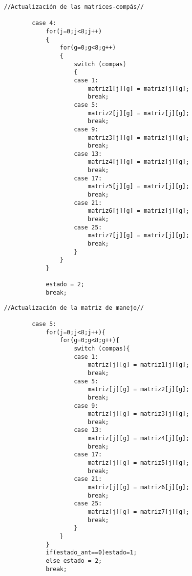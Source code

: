 \documentclass[12pt,a4paper]{article}
\begin{document}
\begin{lstlisting}[basicstyle=\footnotesize] 
            //Actualización de las matrices-compás//

        case 4:
            for(j=0;j<8;j++)
            {
                for(g=0;g<8;g++)
                {
                    switch (compas)
                    {
                    case 1:
                        matriz1[j][g] = matriz[j][g];
                        break;
                    case 5:
                        matriz2[j][g] = matriz[j][g];
                        break;
                    case 9:
                        matriz3[j][g] = matriz[j][g];
                        break;
                    case 13:
                        matriz4[j][g] = matriz[j][g];
                        break;
                    case 17:
                        matriz5[j][g] = matriz[j][g];
                        break;
                    case 21:
                        matriz6[j][g] = matriz[j][g];
                        break;
                    case 25:
                        matriz7[j][g] = matriz[j][g];
                        break;
                    }
                }
            }

            estado = 2;
            break;
\end{lstlisting}

\begin{lstlisting}[basicstyle=\footnotesize] 
            //Actualización de la matriz de manejo//

        case 5:
            for(j=0;j<8;j++){
                for(g=0;g<8;g++){
                    switch (compas){
                    case 1:
                        matriz[j][g] = matriz1[j][g];
                        break;
                    case 5:
                        matriz[j][g] = matriz2[j][g];
                        break;
                    case 9:
                        matriz[j][g] = matriz3[j][g];
                        break;
                    case 13:
                        matriz[j][g] = matriz4[j][g];
                        break;
                    case 17:
                        matriz[j][g] = matriz5[j][g];
                        break;
                    case 21:
                        matriz[j][g] = matriz6[j][g];
                        break;
                    case 25:
                        matriz[j][g] = matriz7[j][g];
                        break;
                    }
                }
            }
            if(estado_ant==0)estado=1;
            else estado = 2;
            break;
\end{lstlisting}
\end{document}
